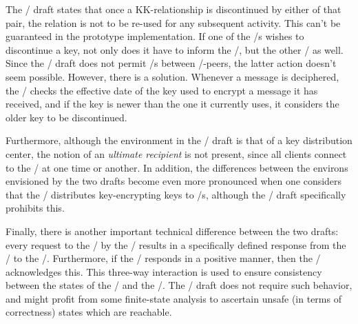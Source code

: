 The \ansi/ draft states that once a KK-relationship is discontinued by either
of that pair,
the relation is not to be re-used for any subsequent activity.
This can't be guaranteed in the prototype implementation.
If one of the \TMA/s wishes to discontinue a key,
not only does it have to inform the \KDS/,
but the other \TMA/ as well.
Since the \TTI/ draft does not permit \CSM/s between \TMA/-peers,
the latter action doesn't seem possible.
However, there is a solution.
Whenever a message is deciphered,
the \TMA/ checks the effective date of the key used to
encrypt a message it has received,
and if the key is newer than the one it currently uses,
it considers the older key to be discontinued.

Furthermore,
although the environment in the \TTI/ draft is that of a key distribution
center,
the notion of an {\it ultimate recipient} is not present,
since all clients connect to the \KDS/ at one time or another.
In addition,
the differences between the environs envisioned by the two drafts
become even more pronounced when one considers that the \KDS/ distributes
key-encrypting keys to \TMA/s,
although the \ansi/ draft specifically prohibits this.

Finally,
there is another important technical difference between the two
drafts:
every request to the \KDS/ by the \TMA/
results in a specifically defined response from the \KDS/ to the \TMA/.
Furthermore,
if the \KDS/ responds in a positive manner,
then the \TMA/ acknowledges this.
This three-way interaction is used to ensure consistency between the states
of the \KDS/ and the \TMA/.
The \ansi/ draft does not require such behavior,
and might profit from some finite-state analysis to ascertain unsafe
(in terms of correctness) states which are reachable.
